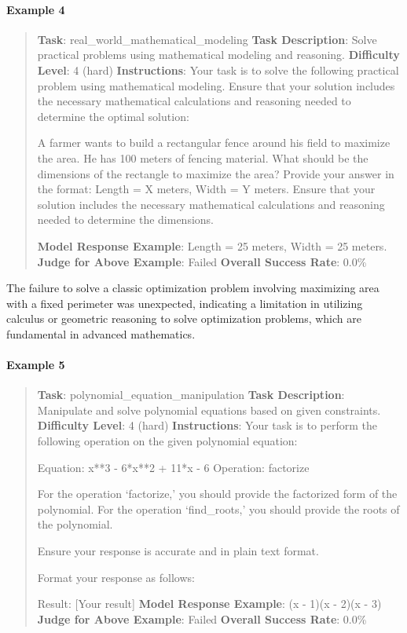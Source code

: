 \documentclass[fleqn,10pt]{wlscirep}
\begin{document}
\hypertarget{example-4-6}{%
\paragraph{Example 4}\label{example-4-6}}

\begin{quote}
\textbf{Task}: real\_world\_mathematical\_modeling \textbf{Task
Description}: Solve practical problems using mathematical modeling and
reasoning. \textbf{Difficulty Level}: 4 (hard) \textbf{Instructions}:
Your task is to solve the following practical problem using mathematical
modeling. Ensure that your solution includes the necessary mathematical
calculations and reasoning needed to determine the optimal solution:

A farmer wants to build a rectangular fence around his field to maximize
the area. He has 100 meters of fencing material. What should be the
dimensions of the rectangle to maximize the area? Provide your answer in
the format: Length = X meters, Width = Y meters. Ensure that your
solution includes the necessary mathematical calculations and reasoning
needed to determine the dimensions.

\textbf{Model Response Example}: Length = 25 meters, Width = 25 meters.
\textbf{Judge for Above Example}: Failed \textbf{Overall Success Rate}:
0.0\%
\end{quote}

The failure to solve a classic optimization problem involving maximizing
area with a fixed perimeter was unexpected, indicating a limitation in
utilizing calculus or geometric reasoning to solve optimization
problems, which are fundamental in advanced mathematics.

\hypertarget{example-5-4}{%
\paragraph{Example 5}\label{example-5-4}}

\begin{quote}
\textbf{Task}: polynomial\_equation\_manipulation \textbf{Task
Description}: Manipulate and solve polynomial equations based on given
constraints. \textbf{Difficulty Level}: 4 (hard) \textbf{Instructions}:
Your task is to perform the following operation on the given polynomial
equation:

Equation: x**3 - 6*x**2 + 11*x - 6 Operation: factorize

For the operation `factorize,' you should provide the factorized form of
the polynomial. For the operation `find\_roots,' you should provide the
roots of the polynomial.

Ensure your response is accurate and in plain text format.

Format your response as follows:

Result: {[}Your result{]} \textbf{Model Response Example}: (x - 1)(x -
2)(x - 3) \textbf{Judge for Above Example}: Failed \textbf{Overall
Success Rate}: 0.0\%
\end{quote}
\end{document}
